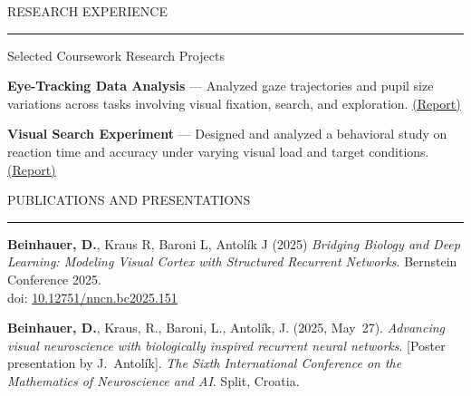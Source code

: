 \documentclass{resume} %
\renewenvironment{rSection}[1]{
\sectionskip
\textcolor{CarnegieMellonRed}{\MakeUppercase{#1}}
\sectionlineskip
\hrule
\begin{list}{}{
\setlength{\leftmargin}{1.5em}
}
\item[]
}{
\end{list}
}
\begin{document}
\begin{rSection}{Research Experience}
\begin{rProject}{\large Selected Coursework Research Projects}{}{}{}
\item \textbf{Eye-Tracking Data Analysis} — Analyzed gaze trajectories and pupil size variations across tasks involving visual fixation, search, and exploration. {\href{https://raw.githack.com/dbeinhauer/etra_challenge/main/etra_challenge_report.html}{(Report)}}
 
\item \textbf{Visual Search Experiment} — Designed and analyzed a behavioral study on reaction time and accuracy under varying visual load and target conditions. {\href{https://raw.githack.com/dbeinhauer/visual_search_experiment/main/visual-search-experiment-report.html}{(Report)}}
 
\end{rProject}

\end{rSection}


\newpage

\begin{rSection}{Publications and Presentations}

\begin{enumerate}[leftmargin=*, label={[\arabic*]}] \itemsep -6pt

\item \textbf{Beinhauer, D.}, Kraus R, Baroni L, Antolík J (2025) \textit{Bridging Biology and Deep Learning: Modeling Visual Cortex with Structured Recurrent Networks}. Bernstein Conference 2025. \\doi: \href{10.12751/nncn.bc2025.151}{10.12751/nncn.bc2025.151}

\item \textbf{Beinhauer, D.}, Kraus, R., Baroni, L., Antolík, J. (2025, May~27). 
\textit{Advancing visual neuroscience with biologically inspired recurrent neural networks}. [Poster presentation by J.~Antolík]. \textit{The Sixth International Conference on the Mathematics of Neuroscience and AI}. Split, Croatia.

\end{enumerate}

\end{rSection}


\end{document}
